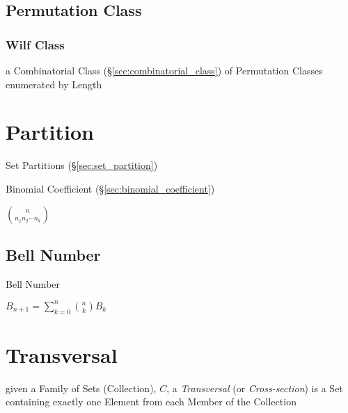 \subsection{Permutation Class}\label{sec:permutation_class}

\subsubsection{Wilf Class}\label{sec:wilf_class}

a Combinatorial Class (\S\ref{sec:combinatorial_class}) of Permutation Classes
enumerated by Length



\section{Partition}\label{sec:partition}

Set Partitions (\S\ref{sec:set_partition})

Binomial Coefficient (\S\ref{sec:binomial_coefficient})

$\binom{n}{n_1 n_2 \cdots n_k}$



\subsection{Bell Number}\label{sec:bell_number}

Bell Number

$B_{n+1} = \sum_{k=0}^n \binom{n}{k} B_k$



\section{Transversal}\label{sec:transversal}

given a Family of Sets (Collection), $C$, a \emph{Transversal} (or
\emph{Cross-section}) is a Set containing exactly one Element from each Member
of the Collection


